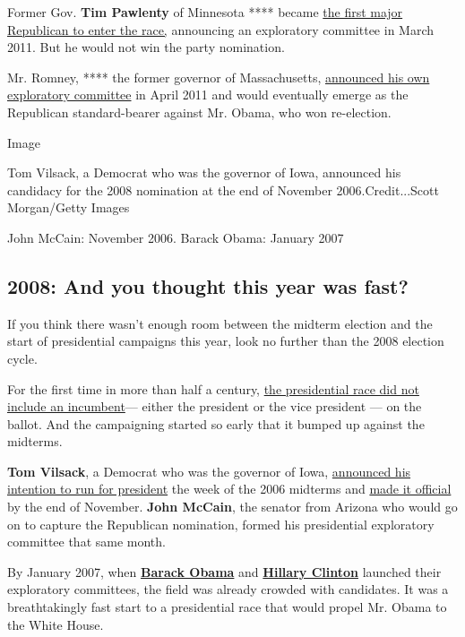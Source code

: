 Former Gov. \textbf{Tim Pawlenty} of Minnesota **** became
\href{https://www.nytimes3xbfgragh.onion/2011/03/22/us/politics/22pawlenty.html}{the
first major Republican to enter the race,} announcing an exploratory
committee in March 2011. But he would not win the party nomination.

Mr. Romney, **** the former governor of Massachusetts,
\href{https://thecaucus.blogs.nytimes3xbfgragh.onion/2011/04/11/romney-makes-it-official-quietly/}{announced
his own exploratory committee} in April 2011 and would eventually emerge
as the Republican standard-bearer against Mr. Obama, who won
re-election.

Image

Tom Vilsack, a Democrat who was the governor of Iowa, announced his
candidacy for the 2008 nomination at the end of November
2006.Credit...Scott Morgan/Getty Images

John McCain: November 2006. Barack Obama: January 2007

\hypertarget{2008-and-you-thought-this-year-was-fast}{%
\subsection{2008: And you thought this year was
fast?}\label{2008-and-you-thought-this-year-was-fast}}

If you think there wasn't enough room between the midterm election and
the start of presidential campaigns this year, look no further than the
2008 election cycle.

For the first time in more than half a century,
\href{https://www.nytimes3xbfgragh.onion/2007/01/22/us/politics/22campaign.html}{the
presidential race did not include an incumbent}--- either the president
or the vice president --- on the ballot. And the campaigning started so
early that it bumped up against the midterms.

\textbf{Tom Vilsack}, a Democrat who was the governor of Iowa,
\href{https://empirezone.blogs.nytimes3xbfgragh.onion/2006/11/09/a-phone-call-to-senator-clinton/}{announced
his intention to run for president} the week of the 2006 midterms and
\href{https://thecaucus.blogs.nytimes3xbfgragh.onion/2006/11/30/vilsack-kicks-off-08-bid/}{made
it official} by the end of November. \textbf{John McCain}, the senator
from Arizona who would go on to capture the Republican nomination,
formed his presidential exploratory committee that same month.

By January 2007, when
\textbf{\href{https://www.nytimes3xbfgragh.onion/2007/01/17/us/politics/17obama.html}{Barack
Obama}} and
\textbf{\href{https://www.nytimes3xbfgragh.onion/2007/01/20/us/politics/20cnd-clinton.html}{Hillary
Clinton}} launched their exploratory committees, the field was already
crowded with candidates. It was a breathtakingly fast start to a
presidential race that would propel Mr. Obama to the White House.

